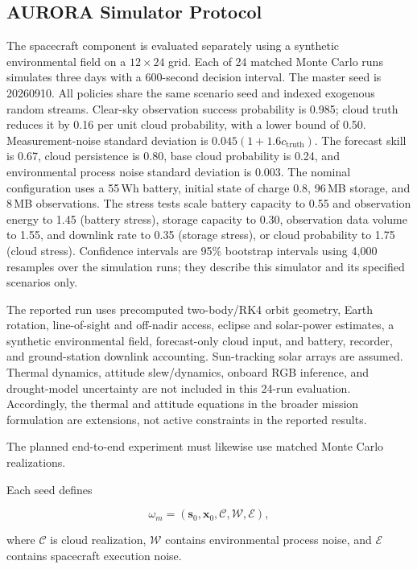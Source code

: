 \documentclass[11pt,a4paper]{article}
\newcommand{\vect}[1]{\bm{#1}}
\begin{document}
\subsection{AURORA Simulator Protocol}
\label{sec:aurora-protocol}

The spacecraft component is evaluated separately using a synthetic
environmental field on a $12\times24$ grid. Each of 24 matched
Monte Carlo runs simulates three days with a 600-second decision
interval. The master seed is 20260910. All policies share the same
scenario seed and indexed exogenous random streams. Clear-sky
observation success probability is 0.985; cloud truth reduces it by
0.16 per unit cloud probability, with a lower bound of 0.50.
Measurement-noise standard deviation is
$0.045(1+1.6c_{\mathrm{truth}})$. The forecast skill is 0.67, cloud
persistence is 0.80, base cloud probability is 0.24, and environmental
process noise standard deviation is 0.003. The nominal configuration
uses a 55\,Wh battery, initial state of charge 0.8, 96\,MB storage, and 8\,MB
observations. The stress tests scale battery capacity to 0.55 and
observation energy to 1.45 (battery stress), storage capacity to 0.30,
observation data volume to 1.55, and downlink rate to 0.35 (storage
stress), or cloud probability to 1.75 (cloud stress). Confidence
intervals are 95\% bootstrap intervals using 4,000 resamples over the simulation runs; they
describe this simulator and its specified scenarios only.

The reported run uses precomputed two-body/RK4 orbit geometry, Earth
rotation, line-of-sight and off-nadir access, eclipse and solar-power
estimates, a synthetic environmental field, forecast-only cloud input,
and battery, recorder, and ground-station downlink accounting.
Sun-tracking solar arrays are assumed. Thermal dynamics, attitude
slew/dynamics, onboard RGB inference, and drought-model uncertainty
are not included in this 24-run evaluation. Accordingly, the thermal
and attitude equations in the broader mission formulation are
extensions, not active constraints in the reported results.

The planned end-to-end experiment must likewise use matched Monte
Carlo realizations.

Each seed defines

\begin{equation}
\omega_m
=
(
\vect s_0,
\vect x_0,
\mathcal C,
\mathcal W,
\mathcal E
),
\end{equation}

where $\mathcal C$ is cloud realization,
$\mathcal W$ contains environmental process noise,
and $\mathcal E$ contains spacecraft execution noise.
\end{document}
